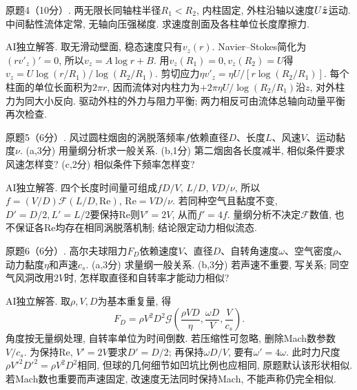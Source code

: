 \begin{exercise}
原题4（10分）. 两无限长同轴柱半径$R_1<R_2$, 内柱固定, 外柱沿轴以速度$U\hat{\boldsymbol{z}}$运动. 中间黏性流体定常, 无轴向压强梯度. 求速度剖面及各柱单位长度摩擦力.
\end{exercise}
\begin{solution}
AI独立解答. 取无滑动壁面, 稳态速度只有$v_z(r)$. Navier--Stokes简化为$(rv'_z)'=0$, 所以$v_z=A\log r+B$. 用$v_z(R_1)=0,v_z(R_2)=U$得$v_z=U\log(r/R_1)/\log(R_2/R_1)$. 剪切应力$\eta v'_z=\eta U/[r\log(R_2/R_1)]$. 每个柱面的单位长面积为$2\pi r$, 因而流体对内柱力为$+2\pi\eta U/\log(R_2/R_1)$沿$z$, 对外柱力为同大小反向. 驱动外柱的外力与阻力平衡; 两力相反可由流体总轴向动量平衡再次检查.
\end{solution}

\begin{exercise}
原题5（6分）. 风过圆柱烟囱的涡脱落频率$f$依赖直径$D$、长度$L$、风速$V$、运动黏度$\nu$. (a,3分) 用量纲分析求一般关系. (b,1分) 第二烟囱各长度减半, 相似条件要求风速怎样变? (c,2分) 相似条件下频率怎样变?
\end{exercise}
\begin{solution}
AI独立解答. 四个长度时间量可组成$fD/V$, $L/D$, $VD/\nu$, 所以$f=(V/D)\mathcal F(L/D,\mathrm{Re})$, $\mathrm{Re}=VD/\nu$. 若同种空气且黏度不变, $D'=D/2,L'=L/2$要保持Re则$V'=2V$, 从而$f'=4f$. 量纲分析不决定$\mathcal F$数值, 也不保证各Re均存在相同涡脱落机制; 结论限定动力相似流态.
\end{solution}

\begin{exercise}
原题6（6分）. 高尔夫球阻力$F_D$依赖速度$V$、直径$D$、自转角速度$\omega$、空气密度$\rho$、动力黏度$\eta$和声速$c_s$. (a,3分) 求量纲一般关系. (b,3分) 若声速不重要, 写关系; 同空气风洞改用$2V$时, 怎样取直径和自转率才能动力相似?
\end{exercise}
\begin{solution}
AI独立解答. 取$\rho,V,D$为基本重复量, 得
\[
F_D=\rho V^2D^2\mathcal G\left(\frac{\rho VD}{\eta},\frac{\omega D}{V},\frac{V}{c_s}\right).
\]
角度按无量纲处理, 自转率单位为时间倒数. 若压缩性可忽略, 删除Mach数参数$V/c_s$. 为保持Re, $V'=2V$要求$D'=D/2$; 再保持$\omega D/V$, 要有$\omega'=4\omega$. 此时力尺度$\rho V'^2D'^2=\rho V^2D^2$相同, 但球的几何细节如凹坑比例也应相同, 原题默认该形状相似. 若Mach数也重要而声速固定, 改速度无法同时保持Mach, 不能声称仍完全相似.
\end{solution}
